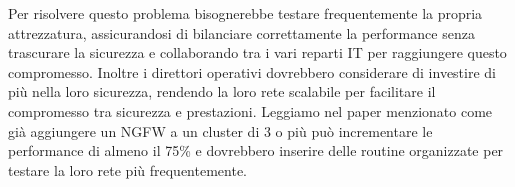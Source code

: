             Per risolvere questo problema bisognerebbe testare frequentemente la propria attrezzatura, assicurandosi di bilanciare correttamente la performance senza trascurare la sicurezza e collaborando tra i vari reparti IT per raggiungere questo compromesso. Inoltre i direttori operativi dovrebbero considerare di investire di più nella loro sicurezza, rendendo la loro rete scalabile per facilitare il compromesso tra sicurezza e prestazioni. Leggiamo nel paper menzionato come già aggiungere un NGFW a un cluster di 3 o più può incrementare le performance di almeno il 75\% e dovrebbero inserire delle routine organizzate per testare la loro rete più frequentemente.
